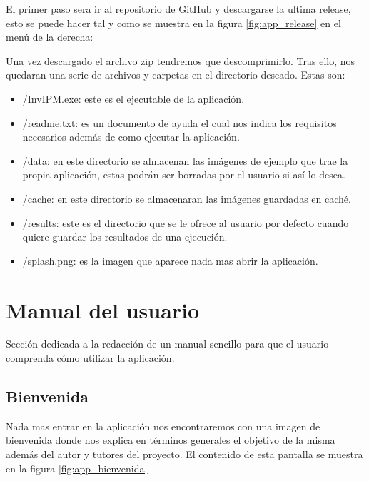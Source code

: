 El primer paso sera ir al repositorio de GitHub y descargarse la ultima release, esto se puede hacer tal y como se muestra en la figura \ref{fig:app_release} en el menú de la derecha:


Una vez descargado el archivo zip tendremos que descomprimirlo. Tras ello, nos quedaran una serie de archivos y carpetas en el directorio deseado. Estas son:
    \begin{itemize}
        \item /InvIPM.exe: este es el ejecutable de la aplicación.
        \item /readme.txt: es un documento de ayuda el cual nos indica los requisitos necesarios además de como ejecutar la aplicación.
        \item /data: en este directorio se almacenan las imágenes de ejemplo que trae la propia aplicación, estas podrán ser borradas por el usuario si así lo desea.
        \item /cache: en este directorio se almacenaran las imágenes guardadas en caché.
        \item /results: este es el directorio que se le ofrece al usuario por defecto cuando quiere guardar los resultados de una ejecución.
        \item /splash.png: es la imagen que aparece nada mas abrir la aplicación.
    \end{itemize}
    
\section{Manual del usuario}\label{manual-del-usuario}

Sección dedicada a la redacción de un manual sencillo para que el usuario comprenda cómo utilizar la aplicación.

\subsection{Bienvenida}\label{bienvenida}

Nada mas entrar en la aplicación nos encontraremos con una imagen de bienvenida donde nos explica en términos generales el objetivo de la misma además del autor y tutores del proyecto. El contenido de esta pantalla se muestra en la figura \ref{fig:app_bienvenida}


